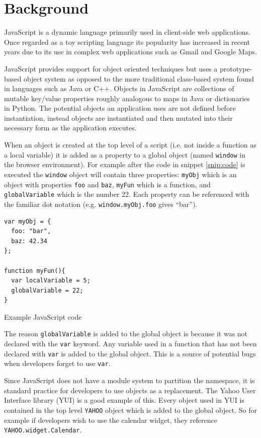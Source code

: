 \documentclass[]{article}
\begin{document}
\section{Background}
\label{sec:background}
JavaScript \cite{ECMA-262} is a dynamic language primarily used in client-side web applications. Once regarded as a toy scripting language its popularity has increased in recent years due to its use in complex web applications such as Gmail and Google Maps.

JavaScript provides support for object oriented techniques but uses a prototype-based object system as opposed to the more traditional class-based system found in languages such as Java or C++. Objects in JavaScript are collections of mutable key/value properties roughly analogous to maps in Java or dictionaries in Python. The potential objects an application uses are not defined before instantiation, instead objects are instantiated and then mutated into their necessary form as the application executes.

When an object is created at the top level of a script (i.e. not inside a function as a local variable) it is added as a property to a global object (named {\tt window} in the browser environment). For example after the code in snippet \ref{snip:code} is executed the {\tt window} object will contain three properties: {\tt myObj} which is an object with properties {\tt foo} and {\tt baz}, {\tt myFun} which is a function, and {\tt globalVariable} which is the number 22. Each property can be referenced with the familiar dot notation (e.g. {\tt window.myObj.foo} gives ``bar'').

\begin{program}[here]
\begin{verbatim}
var myObj = {
  foo: "bar",
  baz: 42.34
};

function myFun(){
  var localVariable = 5;
  globalVariable = 22;
}
\end{verbatim}
\caption{Example JavaScript code}
\label{snip:code}
\end{program}

The reason {\tt globalVariable} is added to the global object is because it was not declared with the {\tt var} keyword. Any variable used in a function that has not been declared with {\tt var} is added to the global object. This is a source of potential bugs when developers forget to use {\tt var}.

Since JavaScript does not have a module system to partition the namespace, it is standard practice for developers to use objects as a replacement. The Yahoo User Interface library (YUI) \cite{yui} is a good example of this. Every object used in YUI is contained in the top level {\tt YAHOO} object which is added to the global object. So for example if developers wish to use the calendar widget, they reference {\tt YAHOO.widget.Calendar}.
\end{document}
